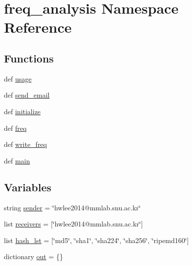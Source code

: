 \hypertarget{namespacefreq__analysis}{\section{freq\-\_\-analysis Namespace Reference}
\label{namespacefreq__analysis}
}
\subsection*{Functions}
\begin{DoxyCompactItemize}
\item 
def \hyperlink{namespacefreq__analysis_ab129a132bdc3c304091394fc025afbc3}{usage}
\item 
def \hyperlink{namespacefreq__analysis_a78f1b3c79387b6d648537019fc6ceeb2}{send\-\_\-email}
\item 
def \hyperlink{namespacefreq__analysis_af137c9b2e7fd1ab28f9ddbb793395464}{initialize}
\item 
def \hyperlink{namespacefreq__analysis_a653c2f50f2030279dd5ae7547bbb1534}{freq}
\item 
def \hyperlink{namespacefreq__analysis_aaa4ed86766ba2225e7c508a42f6a9add}{write\-\_\-freq}
\item 
def \hyperlink{namespacefreq__analysis_a3a6b7e644f1235905588c0bfff1ec2ca}{main}
\end{DoxyCompactItemize}
\subsection*{Variables}
\begin{DoxyCompactItemize}
\item 
string \hyperlink{namespacefreq__analysis_a4e41efc52e7d226b2a5c2a02edc4c0a3}{sender} = \char`\"{}hwlee2014@mmlab.\-snu.\-ac.\-kr\char`\"{}
\item 
list \hyperlink{namespacefreq__analysis_a91e8242f6e2afaf7f39111c0b1d1784b}{receivers} = \mbox{[}\char`\"{}hwlee2014@mmlab.\-snu.\-ac.\-kr\char`\"{}\mbox{]}
\item 
list \hyperlink{namespacefreq__analysis_a81cba3f06fcc98f6122fba48f2ec8ede}{hash\-\_\-lst} = \mbox{[}\char`\"{}md5\char`\"{}, \char`\"{}sha1\char`\"{}, \char`\"{}sha224\char`\"{}, \char`\"{}sha256\char`\"{}, \char`\"{}ripemd160\char`\"{}\mbox{]}
\item 
dictionary \hyperlink{namespacefreq__analysis_a785df9fec2e819d13340b87713ad0fd1}{out} = \{\}
\end{DoxyCompactItemize}


